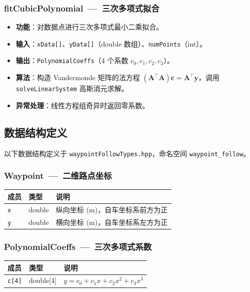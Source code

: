 \documentclass[a4paper,10pt]{article}
\begin{document}
\subsubsection{fitCubicPolynomial~---~三次多项式拟合}

\begin{itemize}
  \item \textbf{功能}：对数据点进行三次多项式最小二乘拟合。
  \item \textbf{输入}：\texttt{xData[]}、\texttt{yData[]}（double 数组）、\texttt{numPoints}（int）。
  \item \textbf{输出}：\texttt{PolynomialCoeffs}（4 个系数 $c_0, c_1, c_2, c_3$）。
  \item \textbf{算法}：构造 Vandermonde 矩阵的法方程 $(\mathbf{A}^{\!\top}\!\mathbf{A})\mathbf{c} = \mathbf{A}^{\!\top}\!\mathbf{y}$，调用 \texttt{solveLinearSystem} 高斯消元求解。
  \item \textbf{异常处理}：线性方程组奇异时返回零系数。
\end{itemize}

\subsection{数据结构定义}

以下数据结构定义于 \texttt{waypointFollowTypes.hpp}，命名空间 \texttt{waypoint\_follow}。

\subsubsection{Waypoint~---~二维路点坐标}
\begin{longtable}{|L{3.5cm}|C{2cm}|L{9.5cm}|}
\hline
\textbf{成员} & \textbf{类型} & \textbf{说明} \\
\hline
\texttt{x} & double & 纵向坐标 (m)，自车坐标系前方为正 \\
\hline
\texttt{y} & double & 横向坐标 (m)，自车坐标系左方为正 \\
\hline
\end{longtable}

\subsubsection{PolynomialCoeffs~---~三次多项式系数}
\begin{longtable}{|L{3.5cm}|C{2cm}|L{9.5cm}|}
\hline
\textbf{成员} & \textbf{类型} & \textbf{说明} \\
\hline
\texttt{c[4]} & double[4] & $y = c_0 + c_1 x + c_2 x^2 + c_3 x^3$ \\
\hline
\end{longtable}
\end{document}
